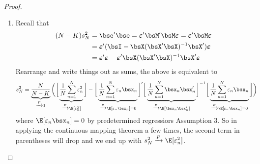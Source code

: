 \documentclass[12pt]{article}
\theoremstyle{plain}
\theoremstyle{definition}
\theoremstyle{remark}
\newcommand{\bsvarepsilon}{\boldsymbol{\varepsilon}}
\newcommand{\pto}{\xrightarrow{P}}
\newcommand{\sumnN}{\sum^N_{n=1}}
\begin{document}
\begin{proof}
\begin{enumerate}
  \item
    Recall that
    \begin{align*}
      (N-K) s^2_N
      &= \bse' \bse
      = \bsvarepsilon'\bsM' \bsM\bsvarepsilon
      = \bsvarepsilon'\bsM\bsvarepsilon \\
      &= \bsvarepsilon'(\bsI - \bsX(\bsX'\bsX)^{-1}\bsX')\bsvarepsilon
      \\
      &= \bsvarepsilon'\bsvarepsilon
        - \bsvarepsilon'\bsX(\bsX'\bsX)^{-1}\bsX'\bsvarepsilon \\
    \end{align*}
    Rearrange and write things out as sums, the above is equivalent to
    \begin{align}
      s^2_N
      &= \underbrace{\frac{N}{N-K}}_{\pto 1}
      \bigg(
        \bigg[
        \underbrace{\frac{1}{N} \sumnN \varepsilon_n^2}_{%
          \pto \E[\varepsilon^2_n]}
         \bigg]
        - \bigg[
        \underbrace{\frac{1}{N} \sumnN \varepsilon_n \bsx_n}_{%
          \pto\E[\varepsilon_n\bsx_n]=0}
        \bigg]'
        \bigg[
        \underbrace{\frac{1}{N} \sumnN \bsx_n\bsx_n'}_{%
          \pto \E[\bsx_n\bsx_n']}
        \bigg]^{-1}
        \bigg[
        \underbrace{\frac{1}{N} \sumnN \varepsilon_n \bsx_n}_{%
          \pto\E[\varepsilon_n\bsx_n]=0}
        \bigg]
      \bigg)
      \label{s2consistent}
    \end{align}
    where $\E[\varepsilon_n\bsx_n]=0$ by predetermined regressiors
    Assumption 3. So in applying the continuous mapping theorem a few
    times, the second term in parentheses will drop and we end up with
    $s^2_N\pto \E[\varepsilon_n^2]$.


\end{enumerate}
\end{proof}
\end{document}
